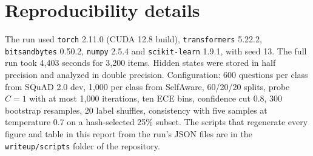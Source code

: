 \documentclass[10pt]{article}
\newcommand{\code}[1]{\texttt{#1}}
\begin{document}
\FloatBarrier
\section{Reproducibility details}
The run used \code{torch} 2.11.0 (CUDA 12.8 build), \code{transformers} 5.22.2, \code{bitsandbytes} 0.50.2, \code{numpy} 2.5.4 and \code{scikit-learn} 1.9.1, with seed 13. The full run took 4,403 seconds for 3,200 items. Hidden states were stored in half precision and analyzed in double precision. Configuration: 600 questions per class from SQuAD 2.0 dev, 1,000 per class from SelfAware, 60/20/20 splits, probe $C=1$ with at most 1,000 iterations, ten ECE bins, confidence cut 0.8, 300 bootstrap resamples, 20 label shuffles, consistency with five samples at temperature 0.7 on a hash-selected 25\% subset. The scripts that regenerate every figure and table in this report from the run's JSON files are in the \code{writeup/scripts} folder of the repository.
\end{document}
